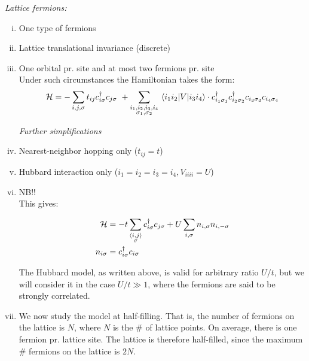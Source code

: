 \emph{Lattice fermions:}
\begin{enumerate}[i)]
    \item One type of fermions
    \item Lattice translational invariance (discrete)
    \item One orbital pr. site and at most two fermions pr. site \\

Under such circumstances the Hamiltonian takes the form:
\begin{equation}
    \mathcal{H} = - \sum_{i, j, \sigma} t_{ij} c_{i\sigma}^\dagger c_{j\sigma} \ + \sum_{\substack{i_1, i_2, i_3, i_4 \\ \sigma_1, \sigma_2}} \mel{i_1 i_2}{V}{i_3 i_4} \cdot c_{i_1\sigma_1}^\dagger c_{i_2\sigma_2}^\dagger c_{i_3\sigma_3} c_{i_4\sigma_4}
\end{equation}

\hspace{-0.5cm} \emph{Further simplifications}

\item Nearest-neighbor hopping only ($t_{ij} = t$)

\item Hubbard interaction only ($i_1 = i_2 = i_3 = i_4, V_{iiii} = U$)

\item {} NB!! \\

This gives:

\begin{align}
    \mathcal{H} &= -t \sum_{\substack{\langle i,j \rangle \\ \sigma}} c_{i\sigma}^\dagger c_{j\sigma} + U \sum_{i, \sigma} n_{i, \sigma} n_{i, -\sigma} \\
    n_{i\sigma} &= c_{i\sigma}^\dagger c_{i\sigma}
\end{align}

The Hubbard model, as written above, is valid for arbitrary ratio $U/t$, but we will consider it in the case $U/t \gg 1 $, where the fermions are said to be strongly correlated.

\item We now study the model at half-filling. That is, the number of fermions on the lattice is $N$, where $N$ is the \# of lattice points. On average, there is one fermion pr. lattice site. The lattice is therefore half-filled, since the maximum \# fermions on the lattice is $2N$. \\
\end{enumerate}


